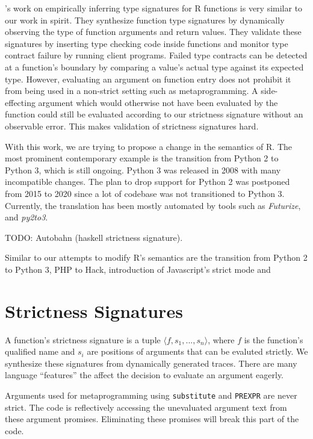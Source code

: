 \documentclass[screen,acmsmall]{acmart}
\newcommand{\code}[1]{\lstinline[style=R]|#1|\xspace}
\begin{document}
\cite{oopsla20b}'s work on empirically inferring type signatures for R functions
is very similar to our work in spirit. They synthesize function type signatures
by dynamically observing the type of function arguments and return values. They
validate these signatures by inserting type checking code inside functions and
monitor type contract failure by running client programs. Failed type contracts
can be detected at a function's boundary by comparing a value's actual type
against its expected type. However, evaluating an argument on function entry
does not prohibit it from being used in a non-strict setting such as
metaprogramming. A side-effecting argument which would otherwise not have been
evaluated by the function could still be evaluated according to our strictness
signature without an observable error. This makes validation of strictness
signatures hard.

With this work, we are trying to propose a change in the semantics of R. The
most prominent contemporary example is the transition from Python 2 to Python 3,
which is still ongoing. Python 3 was released in 2008 with many incompatible
changes. The plan \cite{pysunset} to drop support for Python 2 was postponed
from 2015 to 2020 since a lot of codebase was not transitioned to Python 3.
Currently, the translation has been mostly automated by tools such as
\emph{Futurize}, and \emph{py2to3}.

TODO: Autobahn (haskell strictness signature).

Similar to our attempts to modify R's semantics are the transition from Python 2
to Python 3, PHP to Hack, introduction of Javascript's strict mode and 

\section{Strictness Signatures}

A function's strictness signature is a tuple $\langle f, s_1, ..., s_n \rangle$,
where $f$ is the function's qualified name and $s_i$ are positions of arguments
that can be evaluted strictly. We synthesize these signatures from dynamically
generated traces. There are many language ``features'' the affect the decision
to evaluate an argument eagerly.

Arguments used for metaprogramming using \code{substitute} and \code{PREXPR} are
never strict. The code is reflectively accessing the unevaluated argument text
from these argument promises. Eliminating these promises will break this part of
the code.
\end{document}
